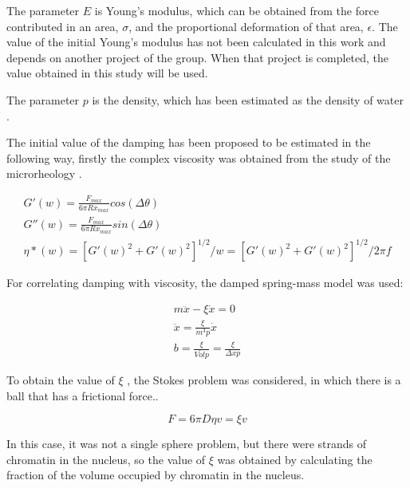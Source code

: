 \documentclass[12pt, a4paper]{article} %
\begin{document}
The parameter $E$ is Young's modulus, which can be obtained from the force contributed in an area, $\sigma$, and the proportional deformation of that area, $\epsilon$. The value of the initial Young's modulus has not been calculated in this work and depends on another project of the group. When that project is completed, the value obtained in this study will be used.

The parameter $p$ is the density, which has been estimated as the density of water \cite{patterson1994measurement}. 

The initial value of the damping has been proposed to be estimated in the following way, firstly the complex viscosity was obtained from the study of the microrheology \cite{el2008measuring}. 

\begin{equation} \label{eqn:microreology}
	\begin{array}{ l }
		
		G'(w) = \frac{F_{max}}{6\pi R x_{max}} cos(\Delta \theta) \\
		G''(w) = \frac{F_{max}}{6\pi R x_{max}} sin(\Delta \theta) \\
		\eta *(w) = [G'(w)^{2}+G'(w)^{2}]^{1/2}/w = [G'(w)^{2}+G'(w)^{2}]^{1/2}/2\pi f
		
	\end{array}
\end{equation}

For correlating damping with viscosity, the damped spring-mass model was used:

\begin{equation} \label{eqn:modelo_masa_resorte}
	\begin{array}{ l }
		
		m\ddot{x} - \xi \dot{x} = 0 \\
		\ddot{x} = \frac{\xi}{m^{3}p}\dot{x} \\
		b = \frac{\xi}{\bar{Vol} p} = \frac{\xi}{\Delta x p}
		
	\end{array}
\end{equation}

To obtain the value of $\xi$ , the Stokes problem was considered, in which there is a ball that has a frictional force..

\begin{equation} \label{eqn:stokes}
	F = 6\pi D \eta v = \xi v
\end{equation}

In this case, it was not a single sphere problem, but there were strands of chromatin in the nucleus, so the value of $\xi$ was obtained by calculating the fraction of the volume occupied by chromatin in the nucleus.
\end{document}
